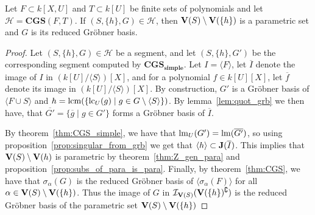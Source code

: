\begin{theorem}\label{thm:segs_are_para}
  Let $F \subset k[X, U]$ and $T \subset k[U]$ be finite sets of polynomials and let $\mathcal H = \mathbf{CGS}(F, T)$. If $(S, \{h\}, G) \in \mathcal H$, then $\operatorname{\mathbf V}(S) \setminus \operatorname{\mathbf V}(\{h\})$ is a parametric set and $G$ is its reduced Gröbner basis.
\end{theorem}
\begin{proof}
  Let $(S, \{h\}, G) \in \mathcal H$ be a segment, and let $(S, \{h\}, G')$ be the corresponding segment computed by $\mathbf{CGS_{simple}}$. Let $I = \langle F \rangle$, let $\overline I$ denote the image of $I$ in $(k[U]/\langle S \rangle)[X]$, and for a polynomial $f \in k[U][X]$, let $\overline f$ denote its image in $(k[U]/\langle S \rangle)[X]$. By construction, $G'$ is a Gröbner basis of $\langle F \cup S \rangle$ and $h = \operatorname{lcm}(\{\operatorname{lc}_{U}(g) \mid g \in G \setminus \langle S \rangle\})$. By lemma~\ref{lem:quot_grb} we then have, that $\overline{G'} = \{\overline g \mid g \in G'\}$ forms a Gröbner basis of $\overline I$.

  By theorem~\ref{thm:CGS_simple}, we have that $\operatorname{lm}_{U}(G') = \operatorname{lm}(\overline{G'})$, so using proposition~\ref{prop:singular_from_grb} we get that $\langle h \rangle \subset \operatorname{\mathbf J}(\overline I)$. This implies that $\operatorname{\mathbf V}(S) \setminus \operatorname{\mathbf V}(h)$ is parametric by theorem~\ref{thm:Z_gen_para} and proposition~\ref{prop:subs_of_para_is_para}. Finally, by theorem~\ref{thm:CGS}, we have that $\sigma_{\alpha}(G)$ is the reduced Gröbner basis of $\langle \sigma_{\alpha}(F) \rangle$ for all $\alpha \in \operatorname{\mathbf V}(S) \setminus \operatorname{\mathbf V}(\{h\})$. Thus the image of $G$ in $\mathcal I_{\operatorname{\mathbf V}(S)}(\operatorname{\mathbf V}(\{h\})^{\complement})$ is the reduced Gröbner basis of the parametric set $\operatorname{\mathbf V}(S) \setminus \operatorname{\mathbf V}(\{h\})$
\end{proof}
